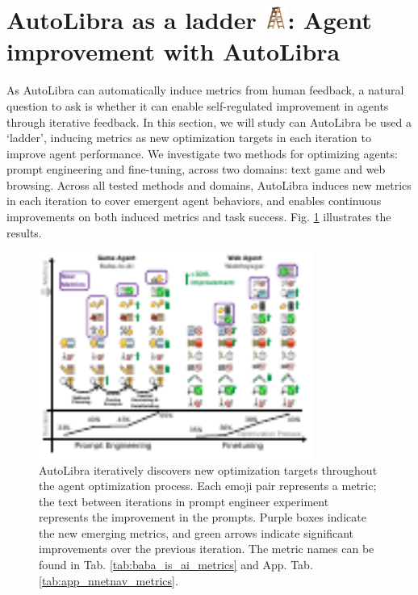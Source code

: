 \section{AutoLibra as a ladder \protect\includegraphics[height=1em]{figs/ladder.png}: Agent improvement with AutoLibra}
\label{sec:ladder}

As AutoLibra can automatically induce metrics from human feedback, a natural question to ask is whether it can enable self-regulated improvement in agents through iterative feedback. 
In this section, we will study can AutoLibra be used a `ladder', inducing metrics as new optimization targets in each iteration to improve agent performance. We investigate two methods for optimizing agents:
prompt engineering and fine-tuning, across two domains: text game and web browsing. Across all tested methods and domains, AutoLibra induces new metrics in each iteration to cover emergent agent behaviors, and enables continuous improvements on both induced metrics and task success.
Fig. \ref{fig:autolibra-training} illustrates the results. 

\begin{figure}[!t]
    \centering
    \includegraphics[width=0.8\textwidth]{figs/autolibra-teaser.pdf}
    \caption{AutoLibra iteratively discovers new optimization targets throughout the agent optimization process. Each emoji pair represents a metric; the text between iterations in prompt engineer experiment represents the improvement in the prompts. Purple boxes indicate the new emerging metrics, and green arrows indicate significant improvements over the previous iteration. The metric names can be found in Tab. \ref{tab:baba_is_ai_metrics} and App. Tab. \ref{tab:app_nnetnav_metrics}.
    }
    \label{fig:autolibra-training}
\end{figure}

